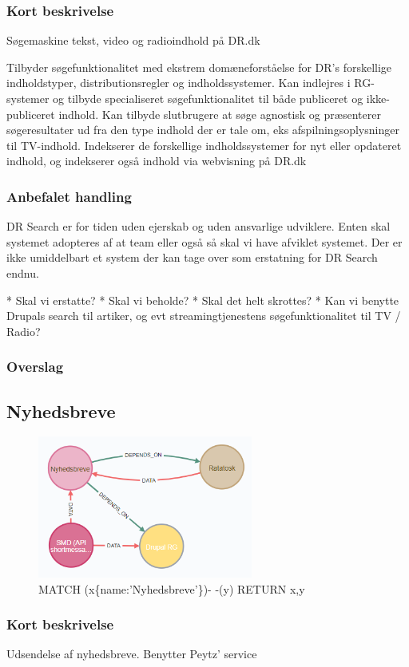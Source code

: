 \documentclass{article}
\begin{document}
\subsubsection{Kort beskrivelse}
Søgemaskine tekst, video og radioindhold på DR.dk	

Tilbyder søgefunktionalitet med ekstrem domæneforståelse for DR's forskellige indholdstyper, distributionsregler og indholdssystemer. Kan indlejres i RG-systemer og tilbyde specialiseret søgefunktionalitet til både publiceret og ikke-publiceret indhold. Kan tilbyde slutbrugere at søge agnostisk og præsenterer søgeresultater ud fra den type indhold der er tale om, eks afspilningsoplysninger til TV-indhold. Indekserer de forskellige indholdssystemer for nyt eller opdateret indhold, og indekserer også indhold via webvisning på DR.dk
\subsubsection{Anbefalet handling}
DR Search er for tiden uden ejerskab og uden ansvarlige udviklere. Enten skal systemet adopteres af at team eller også så skal vi have afviklet systemet. Der er ikke umiddelbart et system der kan tage over som erstatning for DR Search endnu. 

* Skal vi erstatte?
* Skal vi beholde?
* Skal det helt skrottes?
* Kan vi benytte Drupals search til artiker, og evt streamingtjenestens søgefunktionalitet til TV / Radio?
\subsubsection{Overslag}


\subsection{Nyhedsbreve}
\begin{figure}[h]
\includegraphics[width=200pt]{Nyhedsbreve.PNG}
\caption{MATCH (x\{name:'Nyhedsbreve'\})- -(y) RETURN x,y}
\end{figure}
\subsubsection{Kort beskrivelse}
Udsendelse af nyhedsbreve. Benytter Peytz' service	
\end{document}
